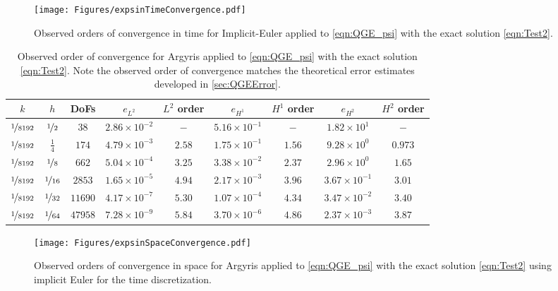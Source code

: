 \begin{figure}
  \begin{center}
    \texttt{[image: Figures/expsinTimeConvergence.pdf]}
    \caption{Observed orders of convergence in time for Implicit-Euler applied to
      \eqref{eqn:QGE_psi} with the exact solution \eqref{eqn:Test2}.}
  \label{fig:Test2Time}
  \end{center}
\end{figure}

\begin{table}
\begin{center}
  \begin{tabular}{|c|c|c|c|c|c|c|c|c|}
    \hline
    $k$ & $h$ & DoFs & $e_{L^2}$ & $L^2$ order & $e_{H^1}$ & $H^1$ order & $e_{H^2}$ & $H^2$ order \\
    \hline
    $\nicefrac{1}{8192}$ & $\nicefrac{1}{2}$ & $38$ & $2.86\times 10^{-2}$ & $-$ & $5.16\times 10^{-1}$ & $-$ & $1.82\times 10^{1}$ & $-$ \\
    $\nicefrac{1}{8192}$ & $\frac{1}{4}$ & $174$ & $4.79\times 10^{-3}$ & $2.58$ & $1.75\times 10^{-1}$ & $1.56$ & $9.28\times 10^0$ & $0.973$\\
    $\nicefrac{1}{8192}$ & $\nicefrac{1}{8}$ & $662$ & $5.04\times 10^{-4}$ & $3.25$ & $3.38\times 10^{-2}$ & $2.37$ & $2.96\times 10^0$ & $1.65$\\
    $\nicefrac{1}{8192}$ & $\nicefrac{1}{16}$ & $2853$ & $1.65\times 10^{-5}$ & $4.94$ & $2.17\times 10^{-3}$ & $3.96$ & $3.67\times 10^{-1}$ & $3.01$\\
    $\nicefrac{1}{8192}$ & $\nicefrac{1}{32}$ & $11690$ & $4.17\times 10^{-7}$ & $5.30$ & $1.07\times 10^{-4}$ & $4.34$ & $3.47\times 10^{-2}$ & $3.40$\\
    $\nicefrac{1}{8192}$ &  $\nicefrac{1}{64}$ & $47958$ & $7.28\times 10^{-9}$ & $5.84$ & $3.70\times 10^{-6}$ & $4.86$ & $2.37\times 10^{-3}$ & $3.87$ \\
    \hline
  \end{tabular}
\end{center}
  \caption{Observed order of convergence for Argyris applied to
    \eqref{eqn:QGE_psi} with the exact solution \eqref{eqn:Test2}. Note the observed
    order of convergence matches the theoretical error estimates developed in
    \autoref{sec:QGEError}.}
    \label{tab:Test2Space}
\end{table}

\begin{figure}
  \begin{center}
    \texttt{[image: Figures/expsinSpaceConvergence.pdf]}
    \caption{Observed orders of convergence in space for Argyris applied to
      \eqref{eqn:QGE_psi} with the exact solution \eqref{eqn:Test2} using
      implicit Euler for the time discretization.}
  \label{fig:Test2Space}
  \end{center}
\end{figure}

